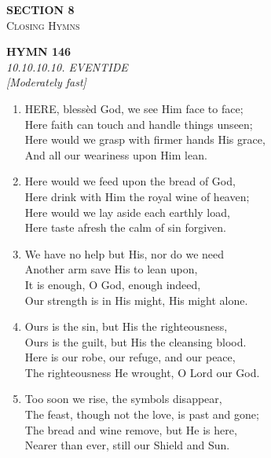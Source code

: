 \newpage
\thispagestyle{empty}
\vspace*{3.5cm}
\begin{center}
    {\LARGE \textbf{SECTION 8}}\\[0.8em]
    {\Large \textsc{Closing Hymns}}
\end{center}
\vspace{3.5cm}

\newpage
\begin{center}
    {\Large \textbf{HYMN 146\textdagger{}}}
    \\
    \textit{10.10.10.10. EVENTIDE}
    \\
    \textit{\small [Moderately fast]}
\end{center}
\vspace{1em}

\begin{enumerate}
    \item HERE, bless\`ed God, we see Him face to face; \\
        Here faith can touch and handle things unseen; \\
        Here would we grasp with firmer hands His grace, \\
        And all our weariness upon Him lean.

    \item Here would we feed upon the bread of God, \\
        Here drink with Him the royal wine of heaven; \\
        Here would we lay aside each earthly load, \\
        Here taste afresh the calm of sin forgiven.

    \item We have no help but His, nor do we need \\
        Another arm save His to lean upon, \\
        It is enough, O God, enough indeed, \\
        Our strength is in His might, His might alone.

    \item Ours is the sin, but His the righteousness, \\
        Ours is the guilt, but His the cleansing blood. \\
        Here is our robe, our refuge, and our peace, \\
        The righteousness He wrought, O Lord our God.

    \item Too soon we rise, the symbols disappear, \\
        The feast, though not the love, is past and gone; \\
        The bread and wine remove, but He is here, \\
        Nearer than ever, still our Shield and Sun.


\end{enumerate}
